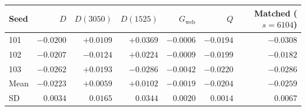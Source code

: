 \begin{tabular}{@{}lrrrrrr@{}}
\toprule
Seed & $D$ & $D(3050)$ & $D(1525)$ & $G_{\text{web}}$ & $Q$ & Matched ($s{=}6104$) \\
\midrule
101 & $-0.0200$ & ${+}0.0109$ & ${+}0.0369$ & $-0.0006$ & $-0.0194$ & $-0.0308$ \\
102 & $-0.0207$ & $-0.0124$ & ${+}0.0224$ & $-0.0009$ & $-0.0199$ & $-0.0182$ \\
103 & $-0.0262$ & ${+}0.0193$ & $-0.0286$ & $-0.0042$ & $-0.0220$ & $-0.0286$ \\
\midrule
Mean & $-0.0223$ & ${+}0.0059$ & ${+}0.0102$ & $-0.0019$ & $-0.0204$ & $-0.0259$ \\
SD & $0.0034$ & $0.0165$ & $0.0344$ & $0.0020$ & $0.0014$ & $0.0067$ \\
\bottomrule
\end{tabular}
